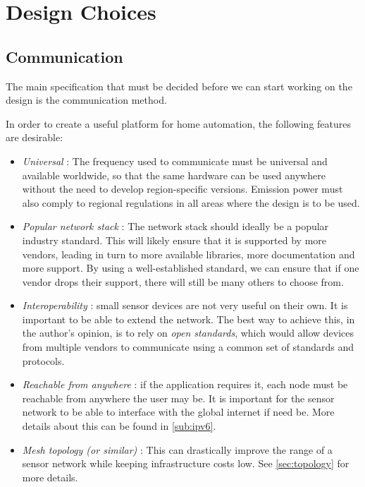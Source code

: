 \chapter{Design Choices}\label{ch:choices}

\section{Communication}\label{sec:communication}

The main specification that must be decided before we can start working on the
design is the communication method.


In order to create a useful platform for home automation, the following features
are desirable:

\begin{itemize}
  \item \emph{Universal} :
    The frequency used to communicate must be universal and available worldwide,
    so that the same hardware can be used anywhere without the need to develop
    region-specific versions. Emission power must also comply to regional
    regulations in all areas where the design is to be used.

  \item \emph{Popular network stack} : 
    The network stack should ideally be a popular industry standard. This will
    likely ensure that it is supported by more vendors, leading in turn to more
    available libraries, more documentation and more support. By using
    a well-established standard, we can ensure that if one vendor drops their
    support, there will still be many others to choose from.

  \item \emph{Interoperability} : small sensor devices are not very useful on
    their own. It is important to be able to extend the network. The best way to
    achieve this, in the author's opinion, is to rely on \emph{open standards},
    which would allow devices from multiple vendors to communicate using
    a common set of standards and protocols. 

  \item \emph{Reachable from anywhere} : if the application requires it, each
    node must be reachable from anywhere the user may be. It is important for
    the sensor network to be able to interface with the global internet if need
    be. More details about this can be found in \autoref{sub:ipv6}.

  \item \emph{Mesh topology (or similar)} : This can drastically improve the
    range of a sensor network while keeping infrastructure costs low. See
    \autoref{sec:topology} for more details.
\end{itemize}


